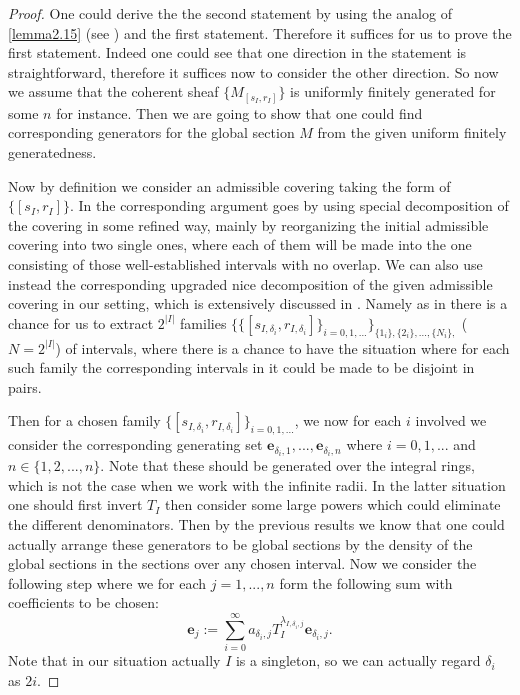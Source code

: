 \documentclass[12pt]{amsart}
\theoremstyle{definition}
\numberwithin{equation}{section}
\begin{document}
\begin{proof}
One could derive the the second statement by using the analog of \cref{lemma2.15} (see \cite[Lemma 4.54]{L}) and the first statement. Therefore it suffices for us to prove the first statement. Indeed one could see that one direction in the statement is straightforward, therefore it suffices now to consider the other direction. So now we assume that the coherent sheaf $\{M_{[s_I,r_I]}\}$ is uniformly finitely generated for some $n$ for instance. Then we are going to show that one could find corresponding generators for the global section $M$ from the given uniform finitely generatedness. 

Now by definition we consider an admissible covering taking the form of $\{[s_I,r_I]\}$. In \cite[Proposition 2.1.13]{KPX} the corresponding argument goes by using special decomposition of the covering in some refined way, mainly by reorganizing the initial admissible covering into two single ones, where each of them will be made into the one consisting of those well-established intervals with no overlap. We can also use instead the corresponding upgraded nice decomposition of the given admissible covering in our setting, which is extensively discussed in \cite[2.6.14-2.6.17]{KL2}. Namely as in \cite[2.6.14-2.6.17]{KL2} there is a chance for us to extract $2^{|I|}$ families $\{\{[s_{I,\delta_i},r_{I,\delta_i}]\}_{i=0,1,...}\}_{\{1_i\},\{2_i\},...,\{N_i\},}$ ($N=2^{|I|}$) of intervals, where there is a chance to have the situation where for each such family the corresponding intervals in it could be made to be disjoint in pairs.

Then for a chosen family $\{[s_{I,\delta_i},r_{I,\delta_i}]\}_{i=0,1,...}$, we now for each $i$ involved we consider the corresponding generating set $\mathbf{e}_{\delta_i,1},...,\mathbf{e}_{\delta_i,n}$ where $i=0,1,...$ and $n\in \{1,2,...,n\}$. Note that these should be generated over the integral rings, which is not the case when we work with the infinite radii. In the latter situation one should first invert $T_I$ then consider some large powers which could eliminate the different denominators. Then by the previous results we know that one could actually arrange these generators to be global sections by the density of the global sections in the sections over any chosen interval. Now we consider the following step where we for each $j=1,...,n$ form the following sum with coefficients to be chosen:
\begin{displaymath}
\mathbf{e}_j:=\sum_{i=0}^\infty a_{\delta_i,j}T_I^{\lambda_{I,\delta_i,j}}\mathbf{e}_{\delta_i,j}.
\end{displaymath}
Note that in our situation actually $I$ is a singleton, so we can actually regard $\delta_i$ as $2i$.




\end{proof}
\end{document}
